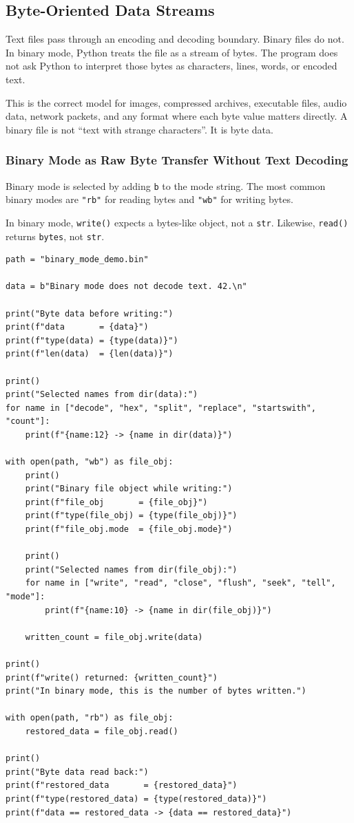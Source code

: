 \subsection{Byte-Oriented Data Streams}

Text files pass through an encoding and decoding boundary. Binary files do not. In binary mode, Python treats the file as a stream of bytes. The program does not ask Python to interpret those bytes as characters, lines, words, or encoded text.

This is the correct model for images, compressed archives, executable files, audio data, network packets, and any format where each byte value matters directly. A binary file is not ``text with strange characters''. It is byte data.

\subsubsection{Binary Mode as Raw Byte Transfer Without Text Decoding}

Binary mode is selected by adding \texttt{b} to the mode string. The most common binary modes are \texttt{"rb"} for reading bytes and \texttt{"wb"} for writing bytes.

In binary mode, \texttt{write()} expects a bytes-like object, not a \texttt{str}. Likewise, \texttt{read()} returns \texttt{bytes}, not \texttt{str}.

\begin{verbatim}
path = "binary_mode_demo.bin"

data = b"Binary mode does not decode text. 42.\n"

print("Byte data before writing:")
print(f"data       = {data}")
print(f"type(data) = {type(data)}")
print(f"len(data)  = {len(data)}")

print()
print("Selected names from dir(data):")
for name in ["decode", "hex", "split", "replace", "startswith", "count"]:
    print(f"{name:12} -> {name in dir(data)}")

with open(path, "wb") as file_obj:
    print()
    print("Binary file object while writing:")
    print(f"file_obj       = {file_obj}")
    print(f"type(file_obj) = {type(file_obj)}")
    print(f"file_obj.mode  = {file_obj.mode}")

    print()
    print("Selected names from dir(file_obj):")
    for name in ["write", "read", "close", "flush", "seek", "tell", "mode"]:
        print(f"{name:10} -> {name in dir(file_obj)}")

    written_count = file_obj.write(data)

print()
print(f"write() returned: {written_count}")
print("In binary mode, this is the number of bytes written.")

with open(path, "rb") as file_obj:
    restored_data = file_obj.read()

print()
print("Byte data read back:")
print(f"restored_data       = {restored_data}")
print(f"type(restored_data) = {type(restored_data)}")
print(f"data == restored_data -> {data == restored_data}")
\end{verbatim}

